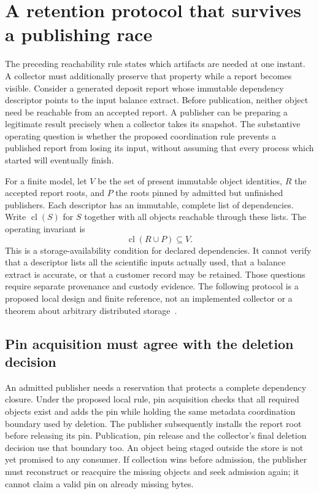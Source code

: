 \section{A retention protocol that survives a publishing race}
\label{exec17:i4-pins}
The preceding reachability rule states which artifacts are needed at one instant. A collector must additionally preserve that property while a report becomes visible. Consider a generated deposit report whose immutable dependency descriptor points to the input balance extract. Before publication, neither object need be reachable from an accepted report. A publisher can be preparing a legitimate result precisely when a collector takes its snapshot. The substantive operating question is whether the proposed coordination rule prevents a published report from losing its input, without assuming that every process which started will eventually finish.

For a finite model, let $V$ be the set of present immutable object identities, $R$ the accepted report roots, and $P$ the roots pinned by admitted but unfinished publishers. Each descriptor has an immutable, complete list of dependencies. Write $\operatorname{cl}(S)$ for $S$ together with all objects reachable through these lists. The operating invariant is
\begin{equation}
 \operatorname{cl}(R\cup P)\subseteq V.
 \label{exec17:i4-live-invariant}
\end{equation}
This is a storage-availability condition for declared dependencies. It cannot verify that a descriptor lists all the scientific inputs actually used, that a balance extract is accurate, or that a customer record may be retained. Those questions require separate provenance and custody evidence. The following protocol is a proposed local design and finite reference, not an implemented collector or a theorem about arbitrary distributed storage~\citep{exec17_retention_reference}.

\subsection{Pin acquisition must agree with the deletion decision}
An admitted publisher needs a reservation that protects a complete dependency closure. Under the proposed local rule, pin acquisition checks that all required objects exist and adds the pin while holding the same metadata coordination boundary used by deletion. The publisher subsequently installs the report root before releasing its pin. Publication, pin release and the collector's final deletion decision use that boundary too. An object being staged outside the store is not yet promised to any consumer. If collection wins before admission, the publisher must reconstruct or reacquire the missing objects and seek admission again; it cannot claim a valid pin on already missing bytes.

